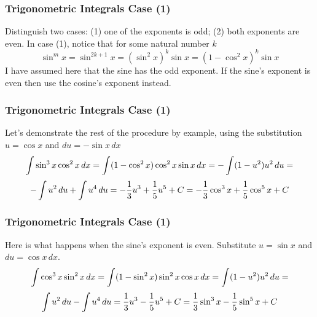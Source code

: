 \documentclass[xcolor=dvipsnames]{beamer}
\begin{document}
\begin{frame}
  \frametitle{Trigonometric Integrals Case (1)}
  Distinguish two cases: (1) one of the exponents is odd; (2) both
  exponents are even. In case (1), notice that for
  some natural number $k$
  \begin{equation}
    \label{eq:oghufohx}
    \sin^{m}x=\sin^{2k+1}x=(\sin^{2}x)^{k}\sin{}x=(1-\cos^{2}x)^{k}\sin{}x
  \end{equation}
  I have assumed here that the sine has the odd exponent. If the
  sine's exponent is even then use the cosine's exponent instead.
\end{frame}

\begin{frame}
  \frametitle{Trigonometric Integrals Case (1)}
  Let's demonstrate the rest of the procedure by example, using the
  substitution $u=\cos{}x$ and $du=-\sin{}x\,dx$
\begin{equation}
  \label{eq:zephulai}
  \int\sin^{3}x\cos^{2}x\,dx=\int(1-\cos^{2}x)\cos^{2}x\sin{}x\,dx=-\int(1-u^{2})u^{2}\,du=\notag
\end{equation}
\begin{equation}
  \label{eq:joochupa}
  -\int{}u^{2}\,du+\int{}u^{4}\,du=-\frac{1}{3}u^{3}+\frac{1}{5}u^{5}+C=-\frac{1}{3}\cos^{3}x+\frac{1}{5}\cos^{5}x+C\notag
\end{equation}
\end{frame}

\begin{frame}
  \frametitle{Trigonometric Integrals Case (1)}
Here is what happens when the sine's exponent is even. Substitute $u=\sin{}x$ and $du=\cos{}x\,dx$.
\begin{equation}
  \label{eq:siengoel}
  \int\cos^{3}x\sin^{2}x\,dx=\int(1-\sin^{2}x)\sin^{2}x\cos{}x\,dx=\int(1-u^{2})u^{2}\,du=\notag
\end{equation}
\begin{equation}
  \label{eq:daejeile}
  \int{}u^{2}\,du-\int{}u^{4}\,du=\frac{1}{3}u^{3}-\frac{1}{5}u^{5}+C=\frac{1}{3}\sin^{3}x-\frac{1}{5}\sin^{5}x+C\notag
\end{equation}
\end{frame}
\end{document}
